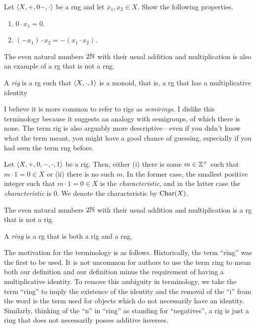 \begin{exr}\label{exrA.1.43}
Let $\langle X,+,0-,\cdot\rangle$ be a rng and let $x_1,x_2\in X$.  Show the following properties.
\begin{enumerate}
\item $0\cdot x_1=0$.
\item $(-x_1)\cdot x_2=-(x_1\cdot x_2)$.
\end{enumerate}
\end{exr}
\begin{exm}
The even natural numbers $2\mathbb{N}$ with their usual addition and multiplication is also an example of a rg that is not a rng.
\end{exm}
\begin{dfn}[Rig]\label{dfnA.1.33}
A \emph{rig} is a rg such that $\langle X,\cdot ,1\rangle$ is a monoid, that is, a rg that has a multiplicative identity
\begin{rmk}
I believe it is more common to refer to rigs as \emph{semirings}.  I dislike this terminology because it suggests an analogy with semigroups, of which there is none.  The term rig is also arguably more descriptive---even if you didn't know what the term meant, you might have a good chance of guessing, especially if you had seen the term rng before.
\end{rmk}
\end{dfn}
\begin{dfn}[Characteristic]
Let $\langle X,+,0,-,\cdot ,1\rangle$ be a rig.  Then, either (i) there is some $m\in \mathbb{Z} ^+$ such that $m\cdot 1=0\in X$ or (ii) there is no such $m$.  In the former case, the smallest positive integer such that $m\cdot 1=0\in X$ is the \emph{characteristic}, and in the latter case the \emph{characteristic} is $0$.  We denote the characteristic by $\operatorname{Char} (X)$.
\end{dfn}
\begin{exm}
The even natural numbers $2\mathbb{N}$ with their usual addition and multiplication is a rg that is not a rig.
\end{exm}
\begin{dfn}[Ring]
A \emph{ring} is a rg that is both a rig and a rng.
\end{dfn}
\begin{rmk}
The motivation for the terminology is as follows.  Historically, the term ``ring'' was the first to be used.  It is not uncommon for authors to use the term ring to mean both our definition and our definition minus the requirement of having a multiplicative identity.  To remove this ambiguity in terminology, we take the term ``ring'' to imply the existence of the identity and the removal of the ``i'' from the word is the term used for objects which do not necessarily have an identity.  Similarly, thinking of the ``n'' in ``ring'' as standing for ``negatives'', a rig is just a ring that does not necessarily posses additive inverses.
\end{rmk}
